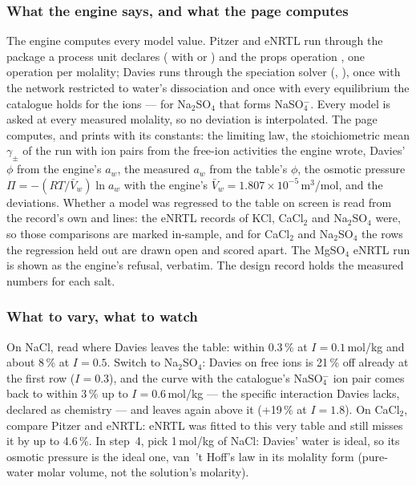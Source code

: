 \documentclass[11pt,a4paper]{article}
\begin{document}
\subsubsection*{What the engine says, and what the page computes}

The engine computes every model value.  Pitzer and eNRTL run through the
package a process unit declares ( with
 or ) and the props
operation , one operation per molality; Davies runs
through the speciation solver (, ),
once with the network restricted to water's dissociation and once with every
equilibrium the catalogue holds for the ions --- for Na$_2$SO$_4$ that forms
NaSO$_4^-$.  Every model is asked at every measured molality, so no
deviation is interpolated.  The page computes, and prints with its constants:
the limiting law, the stoichiometric mean $\gamma_\pm$ of the run with ion
pairs from the free-ion activities the engine wrote, Davies' $\phi$ from the
engine's $a_w$, the measured $a_w$ from the table's $\phi$, the osmotic
pressure $\Pi = -(RT/\bar V_w)\ln a_w$ with the engine's
$\bar V_w = 1.807\times10^{-5}$\,m$^3$/mol, and the deviations.  Whether a
model was regressed to the table on screen is read from the record's own
 and  lines: the eNRTL records of KCl,
CaCl$_2$ and Na$_2$SO$_4$ were, so those comparisons are marked in-sample,
and for CaCl$_2$ and Na$_2$SO$_4$ the rows the regression held out are drawn
open and scored apart.  The MgSO$_4$ eNRTL run is shown as the engine's
refusal, verbatim.  The design record
 holds the measured
numbers for each salt.

\subsubsection*{What to vary, what to watch}

\begin{tryit}
On NaCl, read where Davies leaves the table: within 0.3\,\% at
$I = 0.1$\,mol/kg and about 8\,\% at $I = 0.5$.  Switch to Na$_2$SO$_4$:
Davies on free ions is 21\,\% off already at the first row ($I = 0.3$), and the
curve with the catalogue's NaSO$_4^-$ ion pair comes back to within 3\,\% up to
$I = 0.6$\,mol/kg --- the specific interaction Davies lacks, declared as
chemistry --- and leaves again above it (+19\,\% at $I = 1.8$).  On CaCl$_2$, compare
Pitzer and eNRTL: eNRTL was fitted to this very table and still misses it by
up to 4.6\,\%.  In step~4, pick 1\,mol/kg of NaCl: Davies' water is ideal, so
its osmotic pressure is the ideal one, van~'t Hoff's law in its molality form (pure-water molar volume, not the solution's molarity).
\end{tryit}
\end{document}
